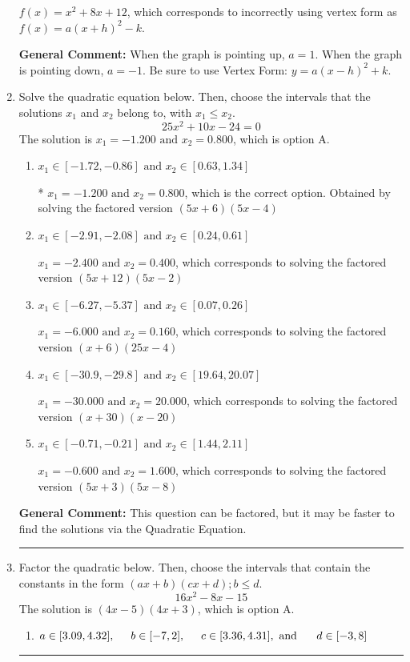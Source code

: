 \documentclass{extbook}[14pt]
\newcommand{\litem}[1]{\item #1

\rule{\textwidth}{0.4pt}}
\begin{document}
\begin{enumerate}
{\begin{enumerate}[label=\Alph*.]
$f(x)=x^{2} +8 x + 12$, which corresponds to incorrectly using vertex form as $f(x) = a(x+h)^2 - k$.
\end{enumerate}

\textbf{General Comment:} When the graph is pointing up, $a=1$. When the graph is pointing down, $a=-1$. Be sure to use Vertex Form: $y = a(x-h)^2+k$.
}
\litem{
Solve the quadratic equation below. Then, choose the intervals that the solutions $x_1$ and $x_2$ belong to, with $x_1 \leq x_2$.
\[ 25x^{2} +10 x -24 = 0 \]The solution is \( x_1 = -1.200 \text{ and } x_2 = 0.800 \), which is option A.\begin{enumerate}[label=\Alph*.]
\item \( x_1 \in [-1.72, -0.86] \text{ and } x_2 \in [0.63, 1.34] \)

* $x_1 = -1.200 \text{ and } x_2 = 0.800$, which is the correct option. Obtained by solving the factored version $(5x + 6)(5x -4)$
\item \( x_1 \in [-2.91, -2.08] \text{ and } x_2 \in [0.24, 0.61] \)

$x_1 = -2.400 \text{ and } x_2 = 0.400$, which corresponds to solving the factored version $(5x + 12)(5x -2)$
\item \( x_1 \in [-6.27, -5.37] \text{ and } x_2 \in [0.07, 0.26] \)

$x_1 = -6.000 \text{ and } x_2 = 0.160$, which corresponds to solving the factored version $(x + 6)(25x -4)$
\item \( x_1 \in [-30.9, -29.8] \text{ and } x_2 \in [19.64, 20.07] \)

$x_1 = -30.000 \text{ and } x_2 = 20.000$, which corresponds to solving the factored version $(x + 30)(x -20)$
\item \( x_1 \in [-0.71, -0.21] \text{ and } x_2 \in [1.44, 2.11] \)

$x_1 = -0.600 \text{ and } x_2 = 1.600$, which corresponds to solving the factored version $(5x + 3)(5x -8)$
\end{enumerate}

\textbf{General Comment:} This question can be factored, but it may be faster to find the solutions via the Quadratic Equation.
}
\litem{
Factor the quadratic below. Then, choose the intervals that contain the constants in the form $(ax+b)(cx+d); b \leq d.$
\[ 16x^{2} -8 x -15 \]The solution is \( (4x -5)(4x + 3) \), which is option A.\begin{enumerate}[label=\Alph*.]
\item \( a \in [3.09, 4.32], \hspace*{5mm} b \in [-7, 2], \hspace*{5mm} c \in [3.36, 4.31], \text{ and } \hspace*{5mm} d \in [-3, 8] \)


\end{enumerate}}
\end{enumerate}
\end{document}
